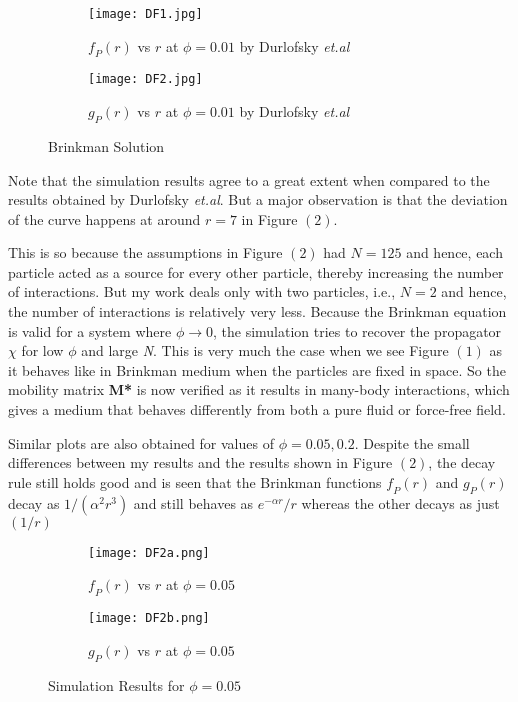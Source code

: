 \documentclass[12pt]{article}
\begin{document}
\begin{figure}[ht]
\begin{subfigure}{.5\textwidth}
  \centering
  \texttt{[image: DF1.jpg]}  
  \caption{$\textit{f}_P(r)$ vs $r$ at $\phi=0.01$ by Durlofsky \textit{et.al}}
\end{subfigure}
\begin{subfigure}{.5\textwidth}
  \centering
  \texttt{[image: DF2.jpg]}  
  \caption{$\textit{g}_P(r)$ vs $r$ at $\phi=0.01$ by Durlofsky \textit{et.al}}
\end{subfigure}
\caption{Brinkman Solution}
\end{figure}

Note that the simulation results agree to a great extent when compared to the results obtained by Durlofsky \textit{et.al}. But a major observation is that the deviation of the curve happens at around $r=7$ in Figure $(2)$.


This is so because the assumptions in Figure $(2)$ had $N=125$ and hence, each particle acted as a source for every other particle, thereby increasing the number of interactions. But my work deals only with two particles, i.e., $N=2$ and hence, the number of interactions is relatively very less. Because the Brinkman equation is valid for a system where $\phi\rightarrow 0$, the simulation tries to recover the propagator $\chi$ for low $\phi$ and large \textit{N}. This is very much the case when we see Figure $(1)$ as it behaves like in Brinkman medium when the particles are fixed in space. So the mobility matrix \textbf{M*} is now verified as it results in many-body interactions, which gives a medium that behaves differently from both a pure fluid or force-free field. 

Similar plots are also obtained for values of $\phi=0.05, 0.2$. Despite the small differences between my results and the results shown in Figure $(2)$, the decay rule still holds good and is seen that the Brinkman functions $\textit{f}_P(r)$ and $\textit{g}_{P}(r)$ decay as $1/(\alpha^2 r^3)$ and still behaves as $e^{-\alpha r}/r$ whereas the other decays as just $(1/r)$

\begin{figure}[ht]
\begin{subfigure}{.5\textwidth}
  \centering
  \texttt{[image: DF2a.png]}  
  \caption{$\textit{f}_P(r)$ vs $r$ at $\phi=0.05$}
\end{subfigure}
\begin{subfigure}{.5\textwidth}
  \centering
  \texttt{[image: DF2b.png]}  
  \caption{$\textit{g}_P(r)$ vs $r$ at $\phi=0.05$}
\end{subfigure}
\caption{Simulation Results for $\phi=0.05$}
\end{figure}
\end{document}
